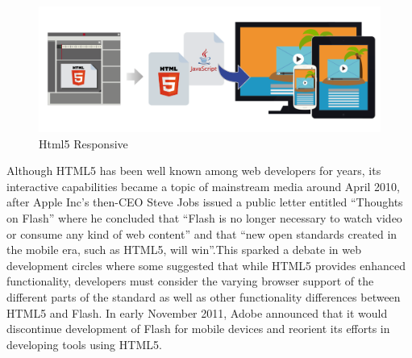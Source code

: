 \begin{figure}[htb]
 \centering
 \includegraphics[width=1.0\linewidth]{images/chapter3/Html5_responsive.png}\hfill
 \caption[Html5 Responsive]{Html5 Responsive}
 \label{fig:fourV}
\end{figure}
Although HTML5 has been well known among web developers for years, its interactive capabilities became a topic of mainstream media around April 2010, after Apple Inc’s then-CEO Steve Jobs issued a public letter entitled “Thoughts on Flash”  where he concluded that “Flash is no longer necessary to watch video or consume any kind of web content” and that “new open standards created in the mobile era, such as HTML5, will win”.This sparked a debate in web development circles where some suggested that while HTML5 provides enhanced functionality, developers must consider the varying browser support of the different parts of the standard as well as other functionality differences between HTML5 and Flash. In early November 2011, Adobe announced that it would discontinue development of Flash for mobile devices and reorient its efforts in developing tools using HTML5.
